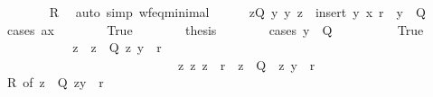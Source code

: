 \begin{isabellebody}
\ \ \ \ \ \ \isamarkupfalse%
\ R\ \isamarkupfalse%
\ {\isacharparenleft}{\kern0pt}auto\ simp{\isacharcolon}{\kern0pt}\ wf{\isacharunderscore}{\kern0pt}eq{\isacharunderscore}{\kern0pt}minimal{\isacharparenright}{\kern0pt}\isanewline
\ \ \ \ \isamarkupfalse%
\ {\isachardoublequoteopen}{\isasymexists}z{\isasymin}Q{\isachardot}{\kern0pt}\ {\isasymforall}y{\isacharprime}{\kern0pt}{\isachardot}{\kern0pt}\ {\isacharparenleft}{\kern0pt}y{\isacharprime}{\kern0pt}{\isacharcomma}{\kern0pt}\ z{\isacharparenright}{\kern0pt}\ {\isasymin}\ insert\ {\isacharparenleft}{\kern0pt}y{\isacharcomma}{\kern0pt}\ x{\isacharparenright}{\kern0pt}\ r\ {\isasymlongrightarrow}\ y{\isacharprime}{\kern0pt}\ {\isasymnotin}\ Q{\isachardoublequoteclose}\isanewline
\ \ \ \ \isamarkupfalse%
\ {\isacharparenleft}{\kern0pt}cases\ {\isachardoublequoteopen}a{\isacharequal}{\kern0pt}x{\isachardoublequoteclose}{\isacharparenright}{\kern0pt}\isanewline
\ \ \ \ \ \ \isamarkupfalse%
\ True\isanewline
\ \ \ \ \ \ \isamarkupfalse%
\ {\isacharquery}{\kern0pt}thesis\isanewline
\ \ \ \ \ \ \isamarkupfalse%
\ {\isacharparenleft}{\kern0pt}cases\ {\isachardoublequoteopen}y\ {\isasymin}\ Q{\isachardoublequoteclose}{\isacharparenright}{\kern0pt}\isanewline
\ \ \ \ \ \ \ \ \isamarkupfalse%
\ True\isanewline
\ \ \ \ \ \ \ \ \isamarkupfalse%
\ \isamarkupfalse%
\ z\ \ {\isachardoublequoteopen}z\ {\isasymin}\ Q{\isachardoublequoteclose}\ {\isachardoublequoteopen}{\isacharparenleft}{\kern0pt}z{\isacharcomma}{\kern0pt}\ y{\isacharparenright}{\kern0pt}\ {\isasymin}\ r\isactrlsup {\isacharasterisk}{\kern0pt}{\isachardoublequoteclose}\isanewline
\ \ \ \ \ \ \ \ \ \ \ \ \ \ \ \ \ \ \ \ \ \ \ \ \ \ \ \ {\isachardoublequoteopen}{\isasymAnd}z{\isacharprime}{\kern0pt}{\isachardot}{\kern0pt}\ {\isacharparenleft}{\kern0pt}z{\isacharprime}{\kern0pt}{\isacharcomma}{\kern0pt}\ z{\isacharparenright}{\kern0pt}\ {\isasymin}\ r\ {\isasymlongrightarrow}\ z{\isacharprime}{\kern0pt}\ {\isasymin}\ Q\ {\isasymlongrightarrow}\ {\isacharparenleft}{\kern0pt}z{\isacharprime}{\kern0pt}{\isacharcomma}{\kern0pt}\ y{\isacharparenright}{\kern0pt}\ {\isasymnotin}\ r\isactrlsup {\isacharasterisk}{\kern0pt}{\isachardoublequoteclose}\isanewline
\ \ \ \ \ \ \ \ \ \ \isamarkupfalse%
\ R{\isacharprime}{\kern0pt}\ {\isacharbrackleft}{\kern0pt}of\ {\isachardoublequoteopen}{\isacharbraceleft}{\kern0pt}z\ {\isasymin}\ Q{\isachardot}{\kern0pt}\ {\isacharparenleft}{\kern0pt}z{\isacharcomma}{\kern0pt}y{\isacharparenright}{\kern0pt}\ {\isasymin}\ r\isactrlsup {\isacharasterisk}{\kern0pt}{\isacharbraceright}{\kern0pt}{\isachardoublequoteclose}{\isacharbrackright}{\kern0pt}\ \isamarkupfalse%

\end{isabellebody}
